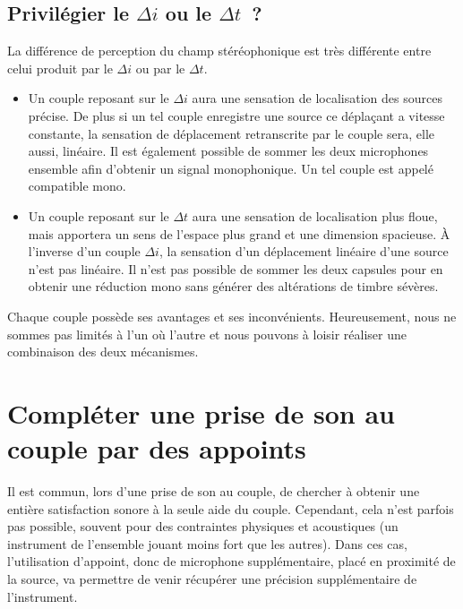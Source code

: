 \documentclass[
]{book}
\providecommand{\tightlist}{%
  \setlength{\itemsep}{0pt}\setlength{\parskip}{0pt}}
\begin{document}
\hypertarget{priviluxe9gier-le-delta-i-ou-le-delta-t}{%
\subsection{\texorpdfstring{Privilégier le \(\Delta i\) ou le \(\Delta t\)~?}{Privilégier le \textbackslash Delta i ou le \textbackslash Delta t~?}}\label{priviluxe9gier-le-delta-i-ou-le-delta-t}}

La différence de perception du champ stéréophonique est très différente entre celui produit par le \(\Delta i\) ou par le \(\Delta t\).

\begin{itemize}
\tightlist
\item
  Un couple reposant sur le \(\Delta i\) aura une sensation de localisation des sources précise. De plus si un tel couple enregistre une source ce déplaçant a vitesse constante, la sensation de déplacement retranscrite par le couple sera, elle aussi, linéaire. Il est également possible de sommer les deux microphones ensemble afin d'obtenir un signal monophonique. Un tel couple est appelé compatible mono.
\item
  Un couple reposant sur le \(\Delta t\) aura une sensation de localisation plus floue, mais apportera un sens de l'espace plus grand et une dimension spacieuse. À l'inverse d'un couple \(\Delta i\), la sensation d'un déplacement linéaire d'une source n'est pas linéaire. Il n'est pas possible de sommer les deux capsules pour en obtenir une réduction mono sans générer des altérations de timbre sévères.
\end{itemize}

Chaque couple possède ses avantages et ses inconvénients. Heureusement, nous ne sommes pas limités à l'un où l'autre et nous pouvons à loisir réaliser une combinaison des deux mécanismes.

\hypertarget{compluxe9ter-une-prise-de-son-au-couple-par-des-appoints}{%
\section{Compléter une prise de son au couple par des appoints}\label{compluxe9ter-une-prise-de-son-au-couple-par-des-appoints}}

Il est commun, lors d'une prise de son au couple, de chercher à obtenir une entière satisfaction sonore à la seule aide du couple. Cependant, cela n'est parfois pas possible, souvent pour des contraintes physiques et acoustiques (un instrument de l'ensemble jouant moins fort que les autres). Dans ces cas, l'utilisation d'appoint, donc de microphone supplémentaire, placé en proximité de la source, va permettre de venir récupérer une précision supplémentaire de l'instrument.
\end{document}
